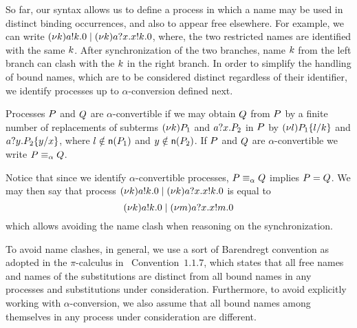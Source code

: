 So far, our syntax allows us to define a process in which a name may be used in distinct binding occurrences, and also to appear free elsewhere.
For example, we can write 
$(\nu k)a!k.0 \;|\; (\nu k)a?x.x!k.0$, 
where, the two restricted names are identified with the same $k$. After synchronization of the two branches, name $k$ from the left branch can clash with the $k$ in the right branch. 
In order to simplify the handling of bound names, which are to be considered distinct regardless of their identifier, we identify processes up to $\alpha$-conversion defined next.
%
\begin{definition}\label{def:alpha-conversion}
Processes $P$ and $Q$ are $\alpha$-convertible if we may obtain $Q$ from $P$ by a finite number of replacements of subterms $(\nu k)P_1$ and $a?x.P_2$ in $P$ by $(\nu l)P_1\{l/k\}$ and $a?y.P_2\{y/x\}$, where $l\notin\mathsf{n}(P_1)$ and $y\notin\mathsf{n}(P_2)$.
If $P$ and $Q$ are $\alpha$-convertible we write $P\equiv_\alpha Q$.
\end{definition}
%
Notice that since we identify $\alpha$-convertible processes, $P\equiv_\alpha Q$ implies $P=Q$.
We may then say that process
$(\nu k)a!k.0 \;|\; (\nu k)a?x.x!k.0$ is 
equal to 
\[
(\nu k)a!k.0 \;|\; (\nu m)a?x.x!m.0
\] 
which allows avoiding the name clash when reasoning on the synchronization.

To avoid name clashes, in general, %
we use a sort of Barendregt convention as adopted in the $\pi$-calculus in~\cite{pi_calculus} Convention~$1.1.7$,
which states that all free names and names of the substitutions are distinct from all bound names in any processes and substitutions under consideration. 
Furthermore, to avoid explicitly working with $\alpha$-conversion, we also assume that all bound names among themselves in any process under consideration are different. 

